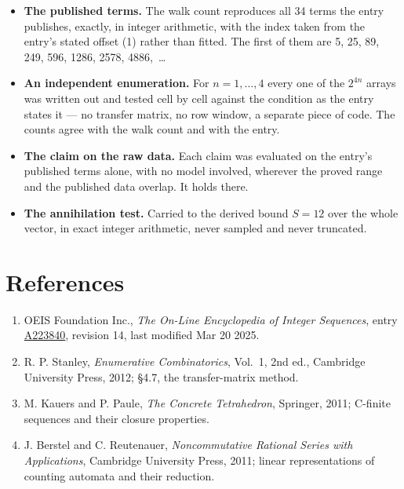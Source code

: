 \documentclass[11pt]{article}
\theoremstyle{definition}
\begin{document}
\begin{itemize}

\item {\bfseries The published terms.} The walk count reproduces all 34 terms the entry publishes, exactly, in integer arithmetic, with the index taken from the entry's stated offset (1) rather than fitted. The first of them are 5, 25, 89, 249, 596, 1286, 2578, 4886,~\dots

\item {\bfseries An independent enumeration.} For $n = 1,\dots,4$ every one of the $2^{4n}$ arrays was written out and tested cell by cell against the condition as the entry states it --- no transfer matrix, no row window, a separate piece of code. The counts agree with the walk count and with the entry.

\item {\bfseries The claim on the raw data.} Each claim was evaluated on the entry's published terms alone, with no model involved, wherever the proved range and the published data overlap. It holds there.

\item {\bfseries The annihilation test.} Carried to the derived bound $S = 12$ over the whole vector, in exact integer arithmetic, never sampled and never truncated.

\end{itemize}

\section{References}

\begin{enumerate}

\item OEIS Foundation Inc., \emph{The On-Line Encyclopedia of Integer Sequences}, entry \href{https://oeis.org/A223840}{A223840}, revision 14, last modified Mar 20 2025.

\item R. P. Stanley, \emph{Enumerative Combinatorics}, Vol.~1, 2nd ed., Cambridge University Press, 2012; \S4.7, the transfer-matrix method.

\item M. Kauers and P. Paule, \emph{The Concrete Tetrahedron}, Springer, 2011; C-finite sequences and their closure properties.

\item J. Berstel and C. Reutenauer, \emph{Noncommutative Rational Series with Applications}, Cambridge University Press, 2011; linear representations of counting automata and their reduction.

\end{enumerate}
\end{document}
